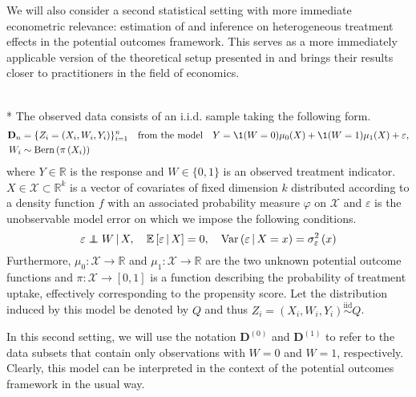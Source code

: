 We will also consider a second statistical setting with more immediate econometric relevance: estimation of and inference on heterogeneous treatment effects in the potential outcomes framework.
This serves as a more immediately applicable version of the theoretical setup presented in \citet{ritzwoller_simultaneous_2024} and brings their results closer to practitioners in the field of economics.
\begin{boxD}
	\begin{asm}\label{asm:CATE_dgp}\mbox{}\\*
		The observed data consists of an i.i.d. sample taking the following form.
		\begin{equation}\label{DGP2}
			\begin{aligned}
				\mathbf{D}_n & = \{Z_{i} = (X_{i}, W_{i}, Y_{i})\}_{i = 1}^{n}
				\quad \text{from the model} \quad
				Y = \1(W = 0)\mu_{0}(X) + \1(W = 1)\mu_1(X) + \varepsilon,	\\
				W_{i} & \sim \operatorname{Bern}\left(\pi\left(X_{i}\right)\right)
			\end{aligned}
		\end{equation}
		where $Y \in \mathbb{R}$ is the response and $W \in \{0,1\}$ is an observed treatment indicator.
		$X \in \mathcal{X} \subset \mathbb{R}^k$ is a vector of covariates of fixed dimension $k$ distributed according to a density function $f$ with an associated probability measure $\varphi$ on $\mathcal{X}$ and $\varepsilon$ is the unobservable model error on which we impose the following conditions.
		\begin{equation}
			\varepsilon \perp\!\!\!\!\perp W \, | \, X, \quad
			\mathbb{E}\left[\varepsilon \, | \, X\right] = 0, \quad
			\text{Var}\left(\varepsilon \, | \, X = x\right) = \sigma_{\varepsilon}^2\left(x\right)
		\end{equation}
		Furthermore, $\mu_0:\mathcal{X} \rightarrow \mathbb{R}$ and $\mu_1:\mathcal{X} \rightarrow \mathbb{R}$ are the two unknown potential outcome functions and $\pi:\mathcal{X} \rightarrow [0,1]$ is a function describing the probability of treatment uptake, effectively corresponding to the propensity score.
		Let the distribution induced by this model be denoted by $Q$ and thus $Z_{i} = \left(X_{i}, W_{i}, Y_{i}\right) \overset{\text{iid}}{\sim} Q$.
	\end{asm}
\end{boxD}
In this second setting, we will use the notation $\mathbf{D}^{(0)}$ and $\mathbf{D}^{(1)}$ to refer to the data subsets that contain only observations with $W = 0$ and $W = 1$, respectively.
Clearly, this model can be interpreted in the context of the potential outcomes framework in the usual way.

